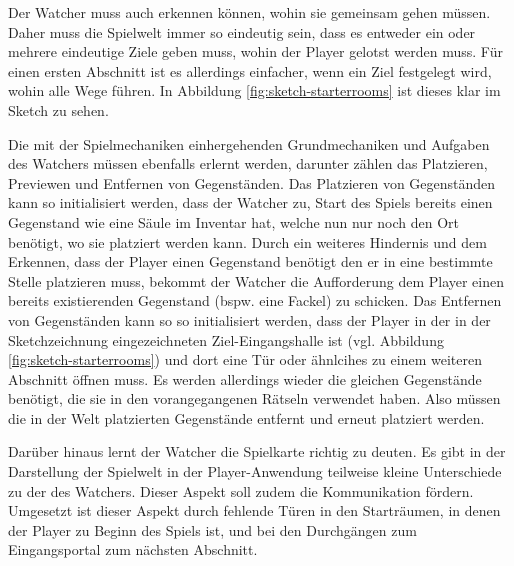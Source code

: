 Der Watcher muss auch erkennen können, wohin sie gemeinsam gehen müssen. Daher muss die Spielwelt immer so eindeutig sein, dass es entweder ein oder mehrere eindeutige Ziele geben muss, wohin der Player gelotst werden muss. Für einen ersten Abschnitt ist es allerdings einfacher, wenn ein Ziel festgelegt wird, wohin alle Wege führen. In Abbildung \ref{fig:sketch-starterrooms} ist dieses klar im Sketch zu sehen. 

Die mit der Spielmechaniken einhergehenden Grundmechaniken und Aufgaben des Watchers müssen ebenfalls erlernt werden, darunter zählen das Platzieren, Previewen und Entfernen von Gegenständen. Das Platzieren von Gegenständen kann so initialisiert werden, dass der Watcher zu, Start des Spiels bereits einen Gegenstand wie eine Säule im Inventar hat, welche nun nur noch den Ort benötigt, wo sie platziert werden kann. Durch ein weiteres Hindernis und dem Erkennen, dass der Player einen Gegenstand benötigt den er in eine bestimmte Stelle platzieren muss, bekommt der Watcher die Aufforderung dem Player einen bereits existierenden Gegenstand (bspw. eine Fackel) zu schicken. Das Entfernen von Gegenständen kann so so initialisiert werden, dass der Player in der in der Sketchzeichnung eingezeichneten Ziel-Eingangshalle ist (vgl. Abbildung \ref{fig:sketch-starterrooms}) und dort eine Tür oder ähnlcihes zu einem weiteren Abschnitt öffnen muss. Es werden allerdings wieder die gleichen Gegenstände benötigt, die sie in den vorangegangenen Rätseln verwendet haben. Also müssen die in der Welt platzierten Gegenstände entfernt und erneut platziert werden.

Darüber hinaus lernt der Watcher die Spielkarte richtig zu deuten. Es gibt in der Darstellung der Spielwelt in der Player-Anwendung teilweise kleine Unterschiede zu der des Watchers. Dieser Aspekt soll zudem die Kommunikation fördern. Umgesetzt ist dieser Aspekt durch fehlende Türen in den Starträumen, in denen der Player zu Beginn des Spiels ist, und bei den Durchgängen zum Eingangsportal zum nächsten Abschnitt.

